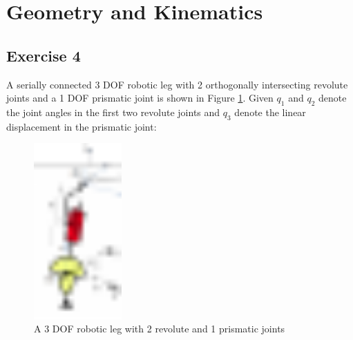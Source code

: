 \section{Geometry and Kinematics}
\subsection{Exercise 4}


A serially connected 3 DOF robotic leg with 2 orthogonally intersecting revolute joints and a 1 DOF prismatic joint is shown in Figure \ref{fig:3dof_robotic_leg}. Given $q_1$ and $q_2$ denote the joint angles in the first two revolute joints and $q_3$ denote the linear displacement in the prismatic joint:

\begin{figure}[H]
	\centering
	\includegraphics[width=0.3\textwidth]{3dofUP.pdf}
	\caption{A 3 DOF robotic leg with 2 revolute and 1 prismatic joints}
	\label{fig:3dof_robotic_leg}
\end{figure}

